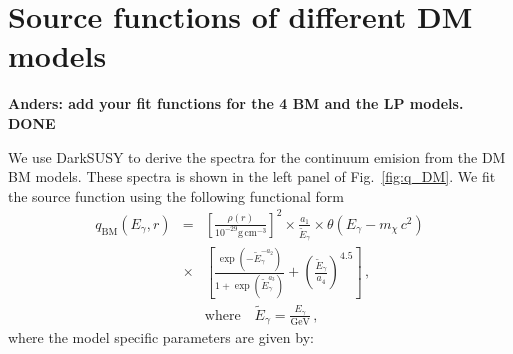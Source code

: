 \documentclass[10pt,aps,pra,reprint,amsmath,amsfonts,amssymb,showpacs,nofootinbib,floatfix]{revtex4-1}
\def\del#1{{}}
\newcommand{\rmn}{\mathrm}
\newcommand{\msun}{M_\odot}
\newcommand{\cm}{\rmn{cm}}
\newcommand{\egt}{\tilde{E}_\gamma}
\newcommand{\gev}{\rmn{GeV}}
\newcommand{\rvir}{r_{200}}
\newcommand{\mvir}{M_{200}}
\newcommand{\eg}{E_\gamma}
\begin{document}
\del{ we compare the energy densities from different radiation fields
  in a galaxy cluster with the mass $\mvir=6\times10^{14}\msun$. We
  use two different profiles for the SD energy density, where the
  total profile includes the contribution from the ICL, the BCG and
  all the galaxies, while the galaxies are excluded in the smooth
  profile. We find that even for a cluster with a relative small mass
  the energy density of the SD components dominates over the CMB and
  the magnetic fields (with a central B field of 3~$\mu G$) within
  about 10\% of $\rvir$. Outside this radius the CMB is dominating the
  energy density of the cluster, hence the magnetic fields are always
  subdominant in the cluster and can safely be removed from cluster IC
  calculations for a reasonable central B-field and spectral
  index. Note that in this work we keep the contribution from B-fields
  to the total energy density for consistency.}



\section{Source functions of different DM models}
{\bf Anders: add your fit functions for the 4 BM and the LP models. DONE}

We use {\sc DarkSUSY} to derive the spectra for the continuum emision
from the DM BM models. These spectra is shown in the left panel of
Fig.~\ref{fig:q_DM}. We fit the source function using the following
functional form
\begin{eqnarray}
q_\rmn{BM} (\eg,r)&=&\left[\frac{\rho(r)}{10^{-29}\rmn{g}\,\cm^{-3}}\right]^2
\times\frac{a_1}{\egt}\times\theta(\eg-m_\chi\,c^2)\nonumber\\
&\times&\left[\frac{\exp\left(-\egt^{-a_2}\right)}{1+\exp\left(\egt^{a_3}\right)}
+\left(\frac{\egt}{a_4}\right)^{4.5}\right]\,, \nonumber\\
&&\rmn{where}\quad \egt = \frac{\eg}{\gev}\,,
 \label{eq:bm_cont}
\end{eqnarray}
where the model specific parameters are given by:

\end{document}
